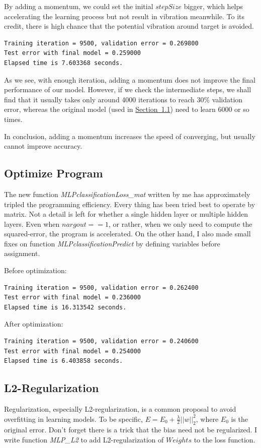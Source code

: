 \documentclass{article}
\begin{document}
By adding a momentum, we could set the initial $stepSize$ bigger, which helps accelerating the learning process but not result in vibration meanwhile. To its credit, there is high chance that the potential vibration around target is avoided.

\begin{verbatim}
Training iteration = 9500, validation error = 0.269800
Test error with final model = 0.259000
Elapsed time is 7.603368 seconds.
\end{verbatim}

As we see, with enough iteration, adding a momentum does not improve the final performance of our model. However, if we check the intermediate steps, we shall find that it usually takes only around 4000 iterations to reach $30\%$ validation error, whereas the original model (used in \hyperref[sec-1.1]{Section~1.1}) need to learn 6000 or so times.

In conclusion, adding a momentum increases the speed of converging, but usually cannot improve accuracy.

\subsection{Optimize Program}
\label{sec-1.3}
The new function \emph{MLPclassificationLoss\_mat} written by me has approximately tripled the programming efficiency. Every thing has been tried best to operate by matrix. Not a detail is left for whether a single hidden layer or multiple hidden layers. Even when $nargout == 1$, or rather, when we only need to compute the squared-error, the program is accelerated. On the other hand, I also made small fixes on function \emph{MLPclassificationPredict} by defining variables before assignment.

Before optimization:
\begin{verbatim}
Training iteration = 9500, validation error = 0.262400
Test error with final model = 0.236000
Elapsed time is 16.313542 seconds.
\end{verbatim}

After optimization:
\begin{verbatim}
Training iteration = 9500, validation error = 0.240600
Test error with final model = 0.254000
Elapsed time is 6.403858 seconds.
\end{verbatim}

\subsection{L2-Regularization}
Regularization, especially L2-regularization, is a common proposal to avoid overfitting in learning models. To be specific, $E = E_0 + \frac{\lambda}{2} ||w||_2^2$, where $E_0$ is the original error. Don't forget there is a trick that the bias need not be regularized. I write function \emph{MLP\_L2} to add L2-regularization of $Weights$ to the loss function.
\end{document}
